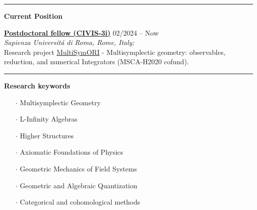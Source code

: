 \documentclass[a4paper]{article}
\newcommand{\block}[1]{\hrule \vspace{0.2cm} \textbf{\Large #1} \vspace{0.2cm}}
\newcommand{\voice}[5]{\href{#4}{\textbf{#1}} \hfill #2 \\ \textit{#3} \\ {\small #5} \vspace{0.2cm} \\}
\begin{document}
\begin{minipage}[t]{0.6\columnwidth}

    \block{Current Position}

    
    \voice{Postdoctoral fellow (CIVIS-3i)}
        {02/2024 -- Now}
        {Sapienza Universit\'a di Roma, Rome, Italy;}
        {https://civis3i.univ-amu.fr/en/civis3i-alliance-programme}       
        {Research project \href{https://civis3i.univ-amu.fr/en/antonio-michele-miti}{MultiSymORI} - Multisymplectic geometry: observables, reduction, and numerical Integrators (MSCA-H2020 cofund).\vspace{-0.25cm}}

    \block{Research keywords}
    
    \begin{itemize}[leftmargin=*, itemsep=0pt, parsep=0pt, topsep=0pt, partopsep=0pt]
    
    \item[$\cdot$] Multisymplectic Geometry
    
    \item[$\cdot$] L-Infinity Algebras
    
    \item[$\cdot$] Higher Structures
    
    \item[$\cdot$] Axiomatic Foundations of Physics
    
    \item[$\cdot$] Geometric Mechanics of Field Systems
    
    \item[$\cdot$] Geometric and Algebraic Quantization
    
    \item[$\cdot$] Categorical and cohomological methods
    
    \end{itemize}
    \vspace{1em}

\end{minipage} 
\hfill
\end{document}
